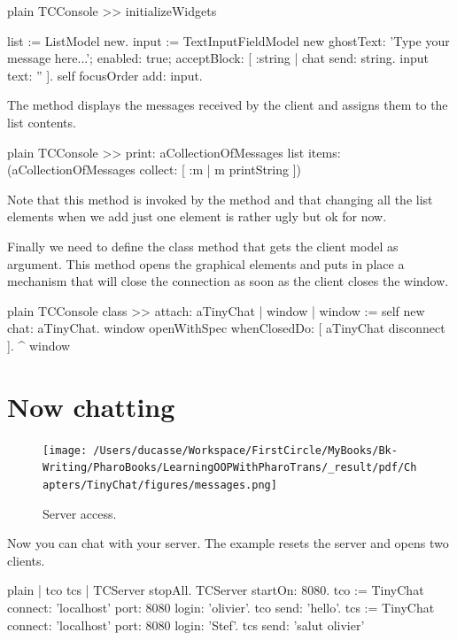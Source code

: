 \documentclass[10pt,twoside,english]{_support/latex/sbabook/sbabook}
\begin{document}
\begin{displaycode}{plain}
TCConsole >> initializeWidgets

	list := ListModel new.
	input := TextInputFieldModel new 
		ghostText: 'Type your message here...';
		enabled: true;
		acceptBlock: [ :string |  
			chat send: string. 
			input text: '' ].
	self focusOrder add: input.
\end{displaycode}

The method  displays the messages received by the client and assigns them to the list contents.

\begin{displaycode}{plain}
TCConsole >> print: aCollectionOfMessages
	list items: (aCollectionOfMessages collect: [  :m |  m printString ])
\end{displaycode}

Note that this method is invoked by the method  and that changing all the list elements when we add just one element is rather ugly but ok for now.

Finally we need to define the class method  that gets the client model as argument.
This method opens the graphical elements and puts in place a mechanism that will close the connection as soon as the client closes the window.
 

\begin{displaycode}{plain}
TCConsole class >> attach: aTinyChat
	| window |
	window := self new chat: aTinyChat.
	window openWithSpec whenClosedDo: [ aTinyChat disconnect ].
	^ window
\end{displaycode}
\section{Now chatting}

\begin{figure}

\begin{center}
\texttt{[image: /Users/ducasse/Workspace/FirstCircle/MyBooks/Bk-Writing/PharoBooks/LearningOOPWithPharoTrans/\_result/pdf/Chapters/TinyChat/figures/messages.png]}\caption{Server access.\label{messages}}\end{center}
\end{figure}


Now you can chat with your server. The example resets the server and opens two clients.

\begin{displaycode}{plain}
| tco tcs |
TCServer stopAll.
TCServer startOn: 8080.
tco := TinyChat connect: 'localhost' port: 8080 login: 'olivier'.
tco send: 'hello'.
tcs := TinyChat connect: 'localhost' port: 8080 login: 'Stef'.	
tcs send: 'salut olivier'
\end{displaycode}
\end{document}
